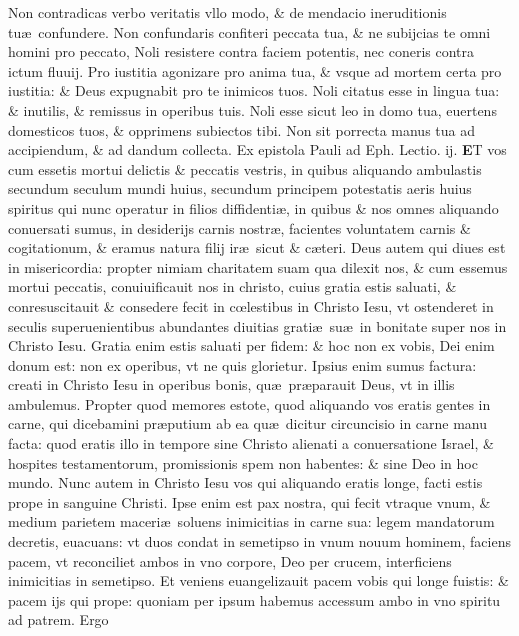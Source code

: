 \documentclass[a5paper,10pt]{book}
\def\rightmarginnote{%
	\lrmarginnote{\hskip\columnwidth \hskip -1em}}
\def\ae{æ}
\def\oe{œ}
\begin{document}
\begin{multicols*}{2}
Non contradicas verbo veritatis vllo modo, \& de mendacio ineruditionis tu\ae \ confundere.
Non confundaris confiteri peccata tua, \& ne subijcias te omni homini pro peccato, Noli resistere contra faciem potentis, nec coneris contra ictum fluuij.
Pro iustitia agonizare pro anima tua, \& vsque ad mortem certa pro iustitia: \& Deus expugnabit pro te inimicos tuos.
Noli citatus esse in lingua tua: \& inutilis, \& remissus in operibus tuis. Noli esse sicut leo in domo tua, euertens domesticos tuos, \& opprimens subiectos tibi.
Non sit porrecta manus tua ad accipiendum, \& ad dandum collecta.
\newline {} \color{red} Ex epistola Pauli ad Eph. \hfill Lectio. ij. \color{black}
\vspace{-2.25em}
\lettrine[lines=2]{\bfseries \color{red} E}{}T\rightmarginnote{ca. 2.} vos cum essetis mortui delictis \& peccatis vestris, in quibus aliquando ambulastis secundum seculum mundi huius, secundum principem potestatis aeris huius spiritus qui nunc operatur in filios diffidenti\ae , in quibus \& nos omnes aliquando
conuersati sumus, in desiderijs carnis nostr\ae , facientes voluntatem carnis \& cogitationum, \& eramus natura filij ir\ae \ sicut \& c\ae teri.
Deus autem qui diues est in misericordia: propter nimiam charitatem suam qua dilexit nos, \& cum essemus mortui peccatis, conuiuificauit nos in christo, cuius gratia estis saluati, \& conresuscitauit \& consedere fecit in c\oe lestibus in Christo Iesu, vt ostenderet in seculis superuenientibus abundantes diuitias grati\ae \ su\ae \ in bonitate super nos in Christo Iesu.
Gratia enim estis saluati per fidem: \& hoc non ex vobis, Dei enim donum est: non ex operibus, vt ne quis glorietur.
Ipsius enim sumus factura: creati in Christo Iesu in operibus bonis, qu\ae \ pr\ae parauit Deus, vt in illis ambulemus.
Propter quod memores estote, quod aliquando vos eratis gentes in carne, qui dicebamini pr\ae putium ab ea qu\ae \ dicitur circuncisio in carne manu facta: quod eratis illo in tempore sine Christo alienati a conuersatione Israel, \& hospites testamentorum, promissionis spem non habentes: \& sine Deo in hoc mundo.
Nunc autem in Christo Iesu vos qui aliquando eratis longe, facti estis prope in sanguine Christi. Ipse enim est pax nostra, qui fecit vtraque vnum, \& medium parietem maceri\ae \ soluens inimicitias in carne sua: legem mandatorum decretis, euacuans: vt duos condat in semetipso in vnum nouum hominem, faciens pacem, vt reconciliet ambos in vno corpore, Deo per crucem, interficiens inimicitias in semetipso.
Et veniens euangelizauit pacem vobis qui longe fuistis: \& pacem ijs qui prope: quoniam per ipsum habemus accessum ambo in vno spiritu ad patrem. Ergo \textdagger \ 

\end{multicols*}
\end{document}
